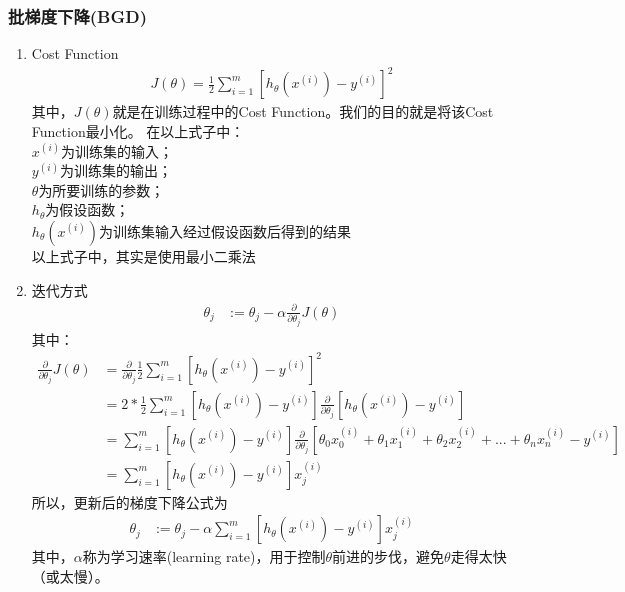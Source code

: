 \subsubsection{批梯度下降(BGD)}
\begin{enumerate}
	\item Cost Function
	\begin{equation}\begin{aligned}
		J(\theta) = \frac{1}{2} \sum_{i=1}^m \left[h_{\theta} {(x^{(i)})} - y^{(i)}\right]^2
	\end{aligned}\end{equation}
	其中，$J(\theta)$就是在训练过程中的Cost Function。我们的目的就是将该Cost Function最小化。
	在以上式子中：\\
		$x^{(i)}$为训练集的输入；\\
		$y^{(i)}$为训练集的输出；\\
		$\theta$为所要训练的参数；\\
		$h_{\theta}$为假设函数；\\
		$h_{\theta} {(x^{(i)})}$为训练集输入经过假设函数后得到的结果\\
		以上式子中，其实是使用最小二乘法

	\item 迭代方式
	\begin{equation}\begin{aligned}
	      \theta_j &:= \theta_j - \alpha \frac{\partial} {\partial \theta_j} J(\theta)
	\end{aligned}\end{equation}
	其中：
	\begin{equation}\begin{aligned}
	      \frac{\partial} {\partial \theta_j} J(\theta) &= \frac{\partial}{\partial \theta_j} \frac{1}{2} \sum_{i=1}^m\left[ h_\theta(x^{(i)}) - y^{(i)} \right]^2 \\
	      &= 2 * \frac{1}{2} \sum_{i=1}^m\left[ h_\theta(x^{(i)}) - y^{(i)} \right] \frac{\partial}{\partial\theta_j}\left[ h_\theta(x^{(i)}) - y^{(i)} \right] \\
	      &= \sum_{i=1}^m\left[ h_\theta(x^{(i)}) - y^{(i)} \right]\frac{\partial}{\partial\theta_j}\left[ \theta_0x_0^{(i)} +  \theta_1x_1^{(i)} + \theta_2x_2^{(i)} + ... + \theta_nx_n^{(i)} - y^{(i)} \right] \\
	      &= \sum_{i=1}^m\left[ h_\theta(x^{(i)}) - y^{(i)} \right]x_j^{(i)}
	\end{aligned}\end{equation}
	所以，更新后的梯度下降公式为
	\begin{equation}\begin{aligned}
		\theta_j &:= \theta_j - \alpha \sum_{i=1}^m \left[ h_\theta(x^{(i)}) - y^{(i)} \right]x_j^{(i)}
	\end{aligned}\end{equation}
	其中，$\alpha$称为学习速率(learning rate)，用于控制$\theta$前进的步伐，避免$\theta$走得太快（或太慢）。\\


\end{enumerate}
